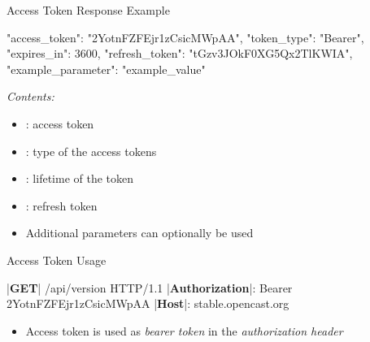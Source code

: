 \documentclass[aspectratio=169]{beamer}
\begin{document}
\begin{frame}[fragile]{Access Token Response Example}
\begin{jsoncode}
{
	"access_token": "2YotnFZFEjr1zCsicMWpAA",
	"token_type": "Bearer",
	"expires_in": 3600,
	"refresh_token": "tGzv3JOkF0XG5Qx2TlKWIA",
	"example_parameter": "example_value"
}
\end{jsoncode}
\vspace{2mm}
	\emph{Contents:}
	\begin{itemize}
		\item {}: access token \hfill {}
		\item {}: type of the access tokens
		\item {}: lifetime of the token
		\item {}: refresh token \hfill {}
		\item Additional parameters can optionally be used
	\end{itemize}
	\vspace*{-2mm}
\end{frame}

\begin{frame}[fragile]{Access Token Usage}
\begin{textcode}
|\textbf{GET}|   /api/version
      HTTP/1.1
|\textbf{Authorization}|: Bearer 2YotnFZFEjr1zCsicMWpAA
|\textbf{Host}|: stable.opencast.org
\end{textcode}

\hfill {}
	
	\begin{itemize}
		\item Access token is used as \emph{bearer token} in the \emph{authorization header}
	\end{itemize}
	
\end{frame}
\end{document}
